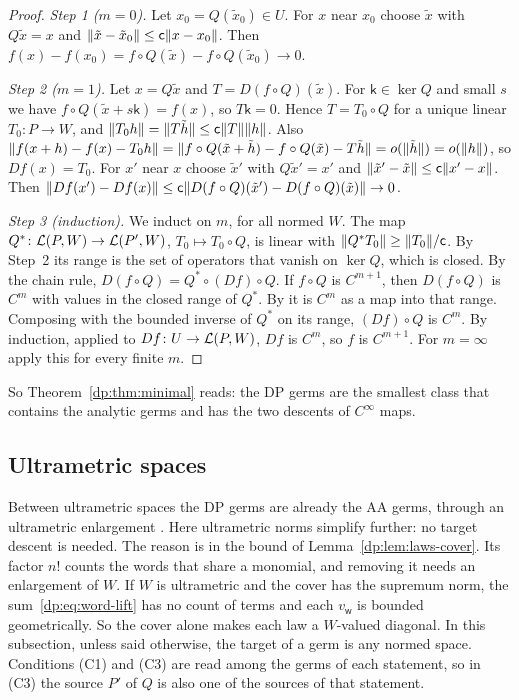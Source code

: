 \begin{proof}
\emph{Step 1 ($m=0$).} Let $x_0=Q(\tilde x_0)\in U$. For $x$ near $x_0$ choose $\tilde x$ with $Q\tilde x=x$ and $\lVert \tilde x-\tilde x_0\rVert\le\mathsf c\lVert x-x_0\rVert$. Then $f(x)-f(x_0)=f\circ Q(\tilde x)-f\circ Q(\tilde x_0)\to0$.

\emph{Step 2 ($m=1$).} Let $x=Q\tilde x$ and $T=D(f\circ Q)(\tilde x)$. For $\mathsf k\in\ker Q$ and small $s$ we have $f\circ Q(\tilde x+s\mathsf k)=f(x)$, so $T\mathsf k=0$. Hence $T=T_0\circ Q$ for a unique linear $T_0\colon P\to W$, and $\lVert T_0h\rVert=\lVert T\tilde h\rVert\le\mathsf c\lVert T\rVert\lVert h\rVert$. Also $\lVert f(x+h)-f(x)-T_0h\rVert=\lVert f\circ Q(\tilde x+\tilde h)-f\circ Q(\tilde x)-T\tilde h\rVert=o(\lVert \tilde h\rVert)=o(\lVert h\rVert)$, so $Df(x)=T_0$. For $x'$ near $x$ choose $\tilde x'$ with $Q\tilde x'=x'$ and $\lVert \tilde x'-\tilde x\rVert\le\mathsf c\lVert x'-x\rVert$. Then $\lVert Df(x')-Df(x)\rVert\le\mathsf c\lVert D(f\circ Q)(\tilde x')-D(f\circ Q)(\tilde x)\rVert\to0$.

\emph{Step 3 (induction).} We induct on $m$, for all normed $W$. The map $Q^*\colon\mathcal L(P,W)\to\mathcal L(P',W)$, $T_0\mapsto T_0\circ Q$, is linear with $\lVert Q^*T_0\rVert\ge\lVert T_0\rVert/\mathsf c$. By Step~2 its range is the set of operators that vanish on $\ker Q$, which is closed. By the chain rule, $D(f\circ Q)=Q^*\circ(Df)\circ Q$. If $f\circ Q$ is $C^{m+1}$, then $D(f\circ Q)$ is $C^m$ with values in the closed range of $Q^*$. By \cite[Lemma~2.4]{I} it is $C^m$ as a map into that range. Composing with the bounded inverse of $Q^*$ on its range, $(Df)\circ Q$ is $C^m$. By induction, applied to $Df\colon U\to\mathcal L(P,W)$, $Df$ is $C^m$, so $f$ is $C^{m+1}$. For $m=\infty$ apply this for every finite $m$.
\end{proof}

So Theorem~\ref{dp:thm:minimal} reads: the DP germs are the smallest class that contains the analytic germs and has the two descents of $C^\infty$ maps.

\subsection{Ultrametric spaces}\label{dp:ssec:um-minimal}

Between ultrametric spaces the DP germs are already the AA germs, through an ultrametric enlargement \cite[Theorem~14.39(1)]{I}. Here ultrametric norms simplify further: no target descent is needed. The reason is in the bound of Lemma~\ref{dp:lem:laws-cover}. Its factor $n!$ counts the words that share a monomial, and removing it needs an enlargement of $W$. If $W$ is ultrametric and the cover has the supremum norm, the sum~\eqref{dp:eq:word-lift} has no count of terms and each $v_{\mathsf w}$ is bounded geometrically. So the cover alone makes each law a $W$-valued diagonal. In this subsection, unless said otherwise, the target of a germ is any normed space. Conditions (C1) and (C3) are read among the germs of each statement, so in (C3) the source $P'$ of $Q$ is also one of the sources of that statement.


